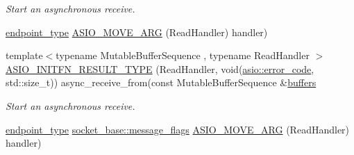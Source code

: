 \begin{DoxyCompactItemize}
\begin{DoxyCompactList}\small\item\em Start an asynchronous receive. \end{DoxyCompactList}\item 
\hyperlink{classasio_1_1basic__raw__socket_a75803815223ab2cbfa66c51a650236b5}{endpoint\+\_\+type} \hyperlink{classasio_1_1basic__raw__socket_af825dabdc37975b1dd6a5cb618f484d5}{A\+S\+I\+O\+\_\+\+M\+O\+V\+E\+\_\+\+A\+R\+G} (Read\+Handler) handler)
\item 
{\footnotesize template$<$typename Mutable\+Buffer\+Sequence , typename Read\+Handler $>$ }\\\hyperlink{classasio_1_1basic__raw__socket_a1b5b0944e7c349bd2c282497c4aa2bd5}{A\+S\+I\+O\+\_\+\+I\+N\+I\+T\+F\+N\+\_\+\+R\+E\+S\+U\+L\+T\+\_\+\+T\+Y\+P\+E} (Read\+Handler, void(\hyperlink{classasio_1_1error__code}{asio\+::error\+\_\+code}, std\+::size\+\_\+t)) async\+\_\+receive\+\_\+from(const Mutable\+Buffer\+Sequence \&\hyperlink{group__async__read_ga54dede45c3175148a77fe6635222c47d}{buffers}
\begin{DoxyCompactList}\small\item\em Start an asynchronous receive. \end{DoxyCompactList}\item 
\hyperlink{classasio_1_1basic__raw__socket_a75803815223ab2cbfa66c51a650236b5}{endpoint\+\_\+type} \hyperlink{classasio_1_1socket__base_ac3cf77465dfedfe1979b5415cf32cc94}{socket\+\_\+base\+::message\+\_\+flags} \hyperlink{classasio_1_1basic__raw__socket_afff1bd52a47c0417d46b8b7e9d120894}{A\+S\+I\+O\+\_\+\+M\+O\+V\+E\+\_\+\+A\+R\+G} (Read\+Handler) handler)
\end{DoxyCompactItemize}
